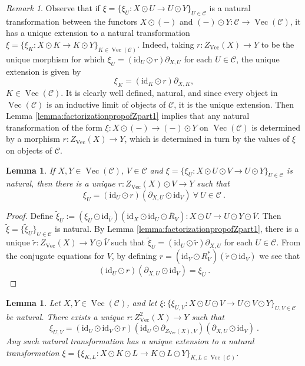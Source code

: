 \documentclass[a4paper,11pt,reqno]{amsart}
\numberwithin{equation}{section}
\newtheorem{lemma}[theorem]{Lemma}
\theoremstyle{remark}
\newtheorem{remark}[theorem]{Remark}
\theoremstyle{definition}
\newcommand{\cC}{\mathcal C}
\DeclareMathOperator{\Vect}{Vec}
\newcommand{\id}{\mathrm{id}}
\begin{document}
\begin{remark}
	Observe that if $\xi = \{\xi_U: X \odot U \to U \odot Y \}_{U \in \cC}$ is a natural transformation between the functors $X \odot (-)$ and $(-) \odot Y: \cC \to \Vect(\cC)$, it has a unique extension to a natural transformation $\xi = \{\xi_K: X \odot K \to K \odot Y \}_{K \in \Vect(\cC)}$. Indeed, taking $r:Z_{\Vect}(X) \to Y$ to be the unique morphism for which $\xi_U = (\id_U \odot r) \partial_{X,U}$ for each $U \in \cC$, the unique extension is given by
	\[
	\xi_K = (\id_K \odot r) \partial_{X,K} ,
	\]
	$K \in \Vect(\cC)$. It is clearly well defined, natural, and since every object in $\Vect(\cC)$ is an inductive limit of objects of $\cC$, it is the unique extension. Then Lemma \ref{lemma:factorizationpropofZpart1} implies that any natural transformation of the form $\xi: X \odot (-) \to (-) \odot Y$ on $\Vect(\cC)$ is determined by a morphism $r: Z_{\Vect}(X) \to Y$, which is determined in turn by the values of $\xi$ on objects of $\cC$.
\end{remark}

\begin{lemma}
	If $X, Y \in \Vect(\cC)$, $V \in \cC$ and $\xi = \{\xi_U: X \odot U \odot V \to U \odot Y \}_{U \in \cC}$ is natural, then there is a unique $r: Z_{\Vect}(X) \odot V \to Y$ such that 
	$$\xi_U = (\id_U \odot r)(\partial_{X,U} \odot \id_V) \ \forall \ U \in \cC \ . $$
	\label{lemma:factorizationpropofZpart2}
\end{lemma}

\begin{proof}
	Define $\tilde{\xi}_U := (\xi_U \odot \id_{\bar{V}})(\id_X \odot \id_U \odot \bar{R}_V): X \odot U \to U \odot Y \odot \bar{V}$. Then $\tilde{\xi} = \{ \tilde{\xi}_U\}_{U \in \cC}$ is natural. By Lemma \ref{lemma:factorizationpropofZpart1}, there is a unique $\tilde{r}:Z_{\Vect}(X) \to Y \odot \bar{V}$ such that $\tilde{\xi}_U = (\id_U \odot \tilde{r})\partial_{X,U}$ for each $U \in \cC$. From the conjugate equations for $V$, by defining $r = (\id_Y \odot R_V^*) (\tilde{r} \odot \id_V)$ we see that
	$$(\id_U \odot r) (\partial_{X,U} \odot \id_V) = \xi_U \ . $$
\end{proof}

\begin{lemma}
	Let $X,Y \in \Vect(\cC)$, and let $\xi: \{ \xi_{U,V}: X \odot U \odot V \to U \odot V \odot Y\}_{U,V \in \cC}$ be natural. There exists a unique $r: Z_{\Vect}^2(X) \to Y$ such that
	$$\xi_{U,V} = (\id_U \odot \id_V \odot r)(\id_U \odot \partial_{Z_{\Vect}(X),V})(\partial_{X,U} \odot \id_V) \ . $$
	Any such natural transformation has a unique extension to a natural transformation $\xi = \{\xi_{K,L}: X \odot K \odot L \to K \odot L \odot Y\}_{K,L \in \Vect(\cC)}$.
	\label{lemma:factorizationpropofZpart3}
\end{lemma}
\end{document}

